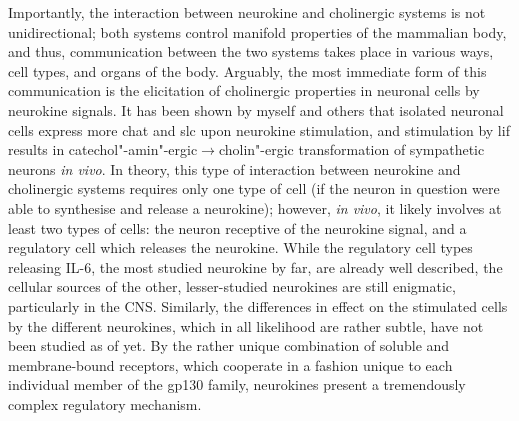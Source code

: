 Importantly, the interaction between neurokine and cholinergic systems is not unidirectional; both systems control manifold properties of the mammalian body, and thus, communication between the two systems takes place in various ways, cell types, and organs of the body. Arguably, the most immediate form of this communication is the elicitation of cholinergic properties in neuronal cells by neurokine signals. It has been shown by myself and others that isolated neuronal cells express more \acf{chat} and \acf{slc} upon neurokine stimulation,\cite{Saadat1989, Crosland1996} and stimulation by \acf{lif} results in catechol"-amin"-ergic$\to$cholin"-ergic transformation of sympathetic neurons \emph{in vivo}.\cite{Stangl2015} In theory, this type of interaction between neurokine and cholinergic systems requires only one type of cell (if the neuron in question were able to synthesise and release a neurokine); however, \emph{in vivo}, it likely involves at least two types of cells: the neuron receptive of the neurokine signal, and a regulatory cell which releases the neurokine. While the regulatory cell types releasing IL-6, the most studied neurokine by far, are already well described, the cellular sources of the other, lesser-studied neurokines are still enigmatic, particularly in the CNS. Similarly, the differences in effect on the stimulated cells by the different neurokines, which in all likelihood are rather subtle, have not been studied as of yet. By the rather unique combination of soluble and membrane-bound receptors, which cooperate in a fashion unique to each individual member of the gp130 family, neurokines present a tremendously complex regulatory mechanism.

